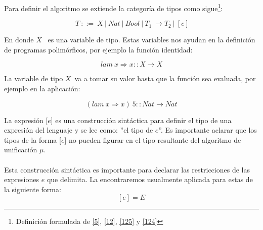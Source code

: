     \begin{definition}
        Para definir el algoritmo se extiende la categoría de tipos como sigue\footnote{Definición formulada de \hyperlink{5}{[5]},  \hyperlink{12}{[12]}, \hyperlink{125}{[125]} y \hyperlink{124}{[124]}}:
        
        $$\ T\ ::=\ X\ |\ Nat\ |\ Bool\ |\ T_1\ \to T_2\ |\ [e]$$
        
        En donde $X$ $\,$ es una variable de tipo. Estas variables nos ayudan en la definición de programas polimórficos, por ejemplo la función identidad:
        
        $$lam\ x\Rightarrow x :: X \to X$$ 
        
        La variable de tipo $X$$\,$ va a tomar su valor hasta que la función sea evaluada, por ejemplo en la aplicación:
       
        $$(lam \ x \Rightarrow x)\ 5 :: Nat \to Nat$$

        La expresión [$e$] es una construcción sintáctica para definir el tipo de una expresión del lenguaje y se lee como: ''el tipo de $e$''. Es importante aclarar que los tipos de la forma [$e$] no pueden figurar en el tipo resultante del algoritmo de unificación $\mu$.\\\\
Esta construcción sintáctica es importante para declarar las restricciones de las expresiones $e$ que delimita. La encontraremos usualmente aplicada para estas de la siguiente forma: $$[e] = E $$
            
    \end{definition}

   \bigskip    


